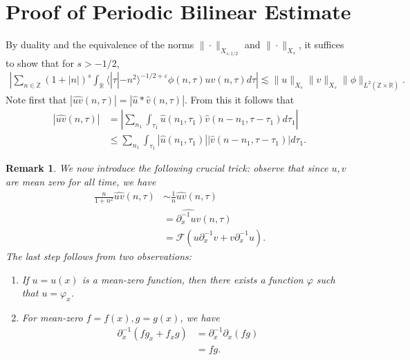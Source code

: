\documentclass[12pt,reqno]{amsart}
\numberwithin{equation}{section}  %
\newcommand{\rr}{\mathbb{R}}
\newcommand{\zz}{\mathbb{Z}}
\newcommand{\zzdot}{\dot{\zz}}
\newcommand{\wh}{\widehat}
\newcommand{\p}{\partial}
\newcommand{\ee}{\varepsilon}
\newtheorem{remark}[theorem]{Remark}
\begin{document}
\section{Proof of Periodic Bilinear Estimate} 
\label{sec:proof-bilin-est}
By duality and the equivalence of the norms $\| \cdot \|_{X_{s,1/2}}$ and $\| \cdot \|_{X_{s}}$, it suffices to show that for $s > -1/2$, 
\begin{equation}
\label{duality-est}
\begin{split}
|	\sum_{n \in \zzdot}  (1 + |n|)^{s}
\int_{\rr} \langle | \tau | - n^{2}  \rangle ^{-1/2 + \ee}\phi(n, \tau) \wh{uv}(n, \tau) d \tau | \lesssim \|u\|_{X_{s}}
\|v\|_{X_{s}}
\|\phi \|_{L^{2}(\zzdot \times \rr)}.
\end{split}
\end{equation}
Note first that $|\wh{uv}(n, \tau) |  = | \wh{u} *  \wh{v} 
(n, \tau)|$. From this it follows that
\begin{equation}
\label{non-lin-rep}
\begin{split}
| \wh{uv}(n, \tau)|
& = | \sum_{n_{1}}  \int_{\tau_{1}}
\wh{u}\left( n_1,  \tau_1 \right) \wh{v}\left( n - n_1 , \tau - \tau_1   
\right) d \tau_1 |
\\
& \le  \sum_{n_{1}}  \int_{\tau_{1}}
|\wh{u}\left( n_1,  \tau_1 \right)| |\wh{v}\left( n - n_1 , \tau - \tau_1   
\right)| d \tau_1.
\end{split}
\end{equation}
\begin{framed}
\begin{remark}
\label{rem:key-trick}
We now introduce the following crucial trick: observe that since $u, v$ are mean zero for all time, we have 
\begin{equation*}
\begin{split}
\frac{n}{1 + n^{2}} \wh{uv}(n, \tau) 
& \sim \frac{1}{n} \wh{uv}(n, \tau)
\\
& = \wh{\p_{x}^{-1} uv}(n, \tau)
\\
& = \mathcal{F}(u \p_{x}^{-1}v + v \p_{x}^{-1} u).
\end{split}
\end{equation*}
The last step follows from two observations: 
\begin{enumerate}
\item{} If $u = u(x)$ is a mean-zero function, then there exists a function $\varphi$ such that $u = \varphi_{x}$.  
\item{} For mean-zero $f=f(x),g=g(x)$, we have
\begin{equation*}
\begin{split}
\p_{x}^{-1}(fg_{x} + f_{x}g) 
& = \p_{x}^{-1} \p_{x}(fg)
\\
&= fg.
\end{split}
\end{equation*}
\end{enumerate}
\end{remark}
\end{framed}
\end{document}
